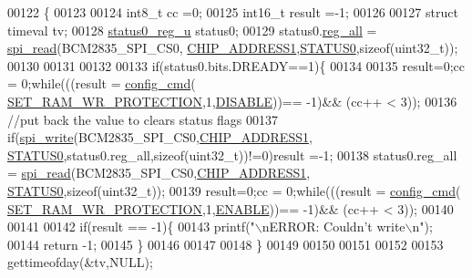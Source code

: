 \begin{DoxyCode}
00122                                 \{
00123 
00124            int8\_t cc =0;
00125            int16\_t result =-1;
00126     
00127            \textcolor{keyword}{struct }timeval tv;
00128            \hyperlink{a00032}{status0\_reg\_u} status0;
00129            status0.\hyperlink{a00032_ae44a0232a79ff51b5ef7aa80e4b35470}{reg\_all} = \hyperlink{a00007_ga7ad9f65ee46aca507374096506a0b1c4}{spi\_read}(BCM2835\_SPI\_CS0,
      \hyperlink{a00037_a94de2b046db6e10257ef4481c0a15eaa}{CHIP\_ADDRESS1},\hyperlink{a00036_aaf584f70289e5fd799fef97c85bb97ee}{STATUS0},\textcolor{keyword}{sizeof}(uint32\_t));
00130           
00131            
00132         
00133            \textcolor{keywordflow}{if}(status0.bits.DREADY==1)\{
00134     
00135            result=0;cc = 0;\textcolor{keywordflow}{while}(((result = \hyperlink{a00005_ga369ee0e8379941cbc2c79b90ec3292da}{config\_cmd}(
      \hyperlink{a00043_a5b534b9caab512045a6e762f3930a501}{SET\_RAM\_WR\_PROTECTION},1,\hyperlink{a00037_a99496f7308834e8b220f7894efa0b6ab}{DISABLE}))== -1)&& (cc++ < 3));  
00136            \textcolor{comment}{//put back the value to clears status flags         }
00137            \textcolor{keywordflow}{if}(\hyperlink{a00007_ga2770219ad8ad1eda1817c0df934b47d0}{spi\_write}(BCM2835\_SPI\_CS0,\hyperlink{a00037_a94de2b046db6e10257ef4481c0a15eaa}{CHIP\_ADDRESS1},
      \hyperlink{a00036_aaf584f70289e5fd799fef97c85bb97ee}{STATUS0},status0.reg\_all,\textcolor{keyword}{sizeof}(uint32\_t))!=0)result =-1; 
00138            status0.reg\_all = \hyperlink{a00007_ga7ad9f65ee46aca507374096506a0b1c4}{spi\_read}(BCM2835\_SPI\_CS0,\hyperlink{a00037_a94de2b046db6e10257ef4481c0a15eaa}{CHIP\_ADDRESS1},
      \hyperlink{a00036_aaf584f70289e5fd799fef97c85bb97ee}{STATUS0},\textcolor{keyword}{sizeof}(uint32\_t));
00139            result=0;cc = 0;\textcolor{keywordflow}{while}(((result = \hyperlink{a00005_ga369ee0e8379941cbc2c79b90ec3292da}{config\_cmd}(
      \hyperlink{a00043_a5b534b9caab512045a6e762f3930a501}{SET\_RAM\_WR\_PROTECTION},1,\hyperlink{a00037_a514ad415fb6125ba296793df7d1a468a}{ENABLE}))== -1)&& (cc++ < 3)); 
00140          
00141            
00142            \textcolor{keywordflow}{if}(result == -1)\{
00143                     printf(\textcolor{stringliteral}{"\(\backslash\)nERROR: Couldn't write\(\backslash\)n"});  
00144                     \textcolor{keywordflow}{return} -1;
00145            \}
00146            
00147             
00148            \}
00149            
00150            
00151            
00152         
00153            gettimeofday(&tv,NULL);

\end{DoxyCode}

